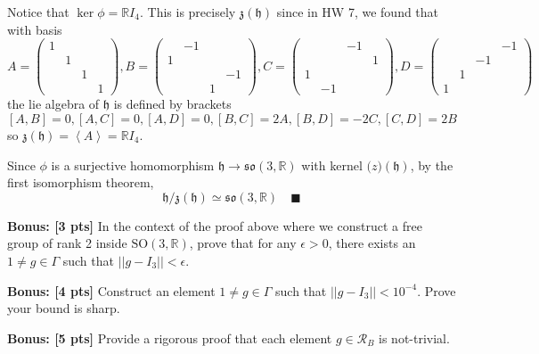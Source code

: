 \documentclass[12pt]{article}
\newcommand{\R}{\mathbb{R}}
\newcommand{\SO}{\text{SO}}
\newcommand{\h}{\mathfrak{h}}
\newcommand{\brak}[1]{\left\langle #1 \right\rangle}
\newcommand{\qed}{\quad \blacksquare}
\begin{document}
        Notice that $\ker \phi = \R I_4$. This is precisely $\mathfrak{z}(\h)$ since in HW 7, we found that with basis 
        \[A = \begin{pmatrix}
            1\\ 
            & 1\\ 
            & & 1\\
            & & & 1
        \end{pmatrix}, B = \begin{pmatrix}
            & -1\\ 
            1 \\ 
            & & & -1\\ 
            & & 1
        \end{pmatrix}, C = \begin{pmatrix}
            & & -1\\ 
            & & & 1\\ 
            1\\ 
            & -1
        \end{pmatrix}, D = \begin{pmatrix}
            & & & -1\\ 
            & & -1\\ 
            & 1\\ 
            1
        \end{pmatrix}\]
        the lie algebra of $\h$ is defined by brackets 
        \[[A, B] = 0, [A, C] = 0, [A, D] = 0, [B, C] = 2A, [B, D] = -2C, [C, D] = 2B\]
        so $\mathfrak{z}(\h) = \brak{A} = \R I_4$. 

        Since $\phi$ is a surjective homomorphism $\h \to \mathfrak{so}(3, \R)$ with kernel $\mathfrak(z)(\h)$, by the first isomorphism theorem, 
        \[\h/\mathfrak{z}(\h) \simeq \mathfrak{so}(3, \R) \qed\]
    \color{black}


\pagebreak

\textbf{Bonus: [3 pts]} In the context of the proof above where we construct a free group of rank 2 inside $\SO(3,\R)$, prove that for any $\epsilon > 0$, there exists an $1 \neq g \in \Gamma$ such that $||g - I_{3}|| < \epsilon$.  

\textbf{Bonus: [4 pts]} Construct an element $1 \neq g \in \Gamma$ such that $||g - I_{3}|| < 10^{-4}$.  Prove your bound is sharp.  

\textbf{Bonus: [5 pts]} Provide a rigorous proof that each element $g \in \mathcal{R}_{B}$ is not-trivial.  
\end{document}
